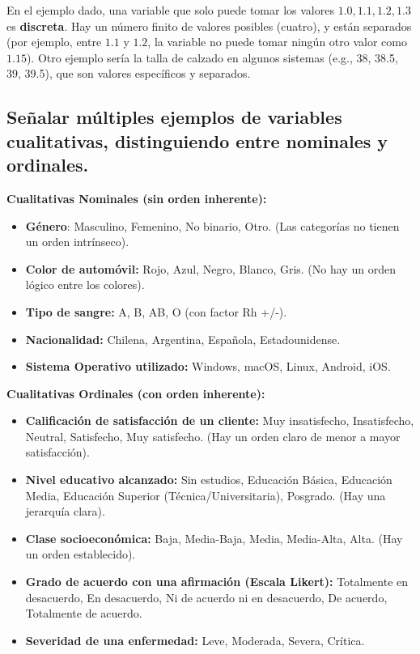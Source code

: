 \documentclass[12pt, letterpaper]{article}
\begin{document}
En el ejemplo dado, una variable que solo puede tomar los valores $1.0, 1.1, 1.2, 1.3$ es \textbf{discreta}. Hay un número finito de valores posibles (cuatro), y están separados (por ejemplo, entre $1.1$ y $1.2$, la variable no puede tomar ningún otro valor como $1.15$). Otro ejemplo sería la talla de calzado en algunos sistemas (e.g., 38, 38.5, 39, 39.5), que son valores específicos y separados.


\subsection{Señalar múltiples ejemplos de variables cualitativas, distinguiendo entre nominales y ordinales.}
\textbf{Cualitativas Nominales (sin orden inherente):}
\begin{itemize}
    \item \textbf{Género}: Masculino, Femenino, No binario, Otro. (Las categorías no tienen un orden intrínseco).
    \item \textbf{Color de automóvil:} Rojo, Azul, Negro, Blanco, Gris. (No hay un orden lógico entre los colores).
    \item \textbf{Tipo de sangre:} A, B, AB, O (con factor Rh +/-).
    \item \textbf{Nacionalidad:} Chilena, Argentina, Española, Estadounidense.
    \item \textbf{Sistema Operativo utilizado:} Windows, macOS, Linux, Android, iOS.
\end{itemize}

\textbf{Cualitativas Ordinales (con orden inherente):}
\begin{itemize}
    \item \textbf{Calificación de satisfacción de un cliente:} Muy insatisfecho, Insatisfecho, Neutral, Satisfecho, Muy satisfecho. (Hay un orden claro de menor a mayor satisfacción).
    \item \textbf{Nivel educativo alcanzado:} Sin estudios, Educación Básica, Educación Media, Educación Superior (Técnica/Universitaria), Posgrado. (Hay una jerarquía clara).
    \item \textbf{Clase socioeconómica:} Baja, Media-Baja, Media, Media-Alta, Alta. (Hay un orden establecido).
    \item \textbf{Grado de acuerdo con una afirmación (Escala Likert):} Totalmente en desacuerdo, En desacuerdo, Ni de acuerdo ni en desacuerdo, De acuerdo, Totalmente de acuerdo.
    \item \textbf{Severidad de una enfermedad:} Leve, Moderada, Severa, Crítica.
\end{itemize}
\end{document}

